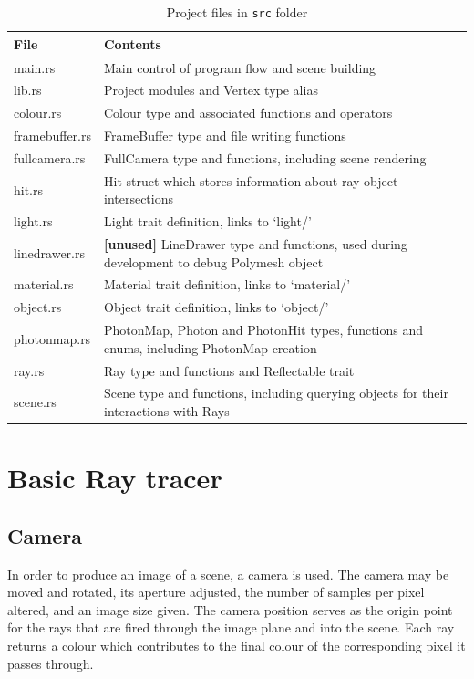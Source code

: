 \documentclass[a4paper]{article}
\begin{document}
\begin{table}[h]
    \centering
    \caption{Project files in \texttt{src} folder}
    \label{tab:projfiles}
        \begin{tabular}{@{}l|l@{}}
            \toprule
            File & Contents \\ \midrule
            main.rs & Main control of program flow and scene building \\
            lib.rs & Project modules and Vertex type alias \\
            colour.rs & Colour type and associated functions and operators \\
            framebuffer.rs & FrameBuffer type and file writing functions \\ 
            fullcamera.rs & FullCamera type and functions, including scene rendering \\
            hit.rs & Hit struct which stores information about ray-object intersections \\
            light.rs & Light trait definition, links to `light/' \\
            linedrawer.rs & \textbf{[unused]} LineDrawer type and functions, used during development to debug Polymesh object \\
            material.rs & Material trait definition, links to `material/' \\
            object.rs &  Object trait definition, links to `object/' \\
            photonmap.rs & PhotonMap, Photon and PhotonHit types, functions and enums, including PhotonMap creation \\
            ray.rs & Ray type and functions and Reflectable trait \\
            scene.rs & Scene type and functions, including querying objects for their interactions with Rays \\
            \bottomrule
        \end{tabular}
\end{table}

\section{Basic Ray tracer}
\subsection{Camera}
In order to produce an image of a scene, a camera is used. The camera may be moved and rotated, its aperture adjusted, the number of samples per pixel altered, and an image size given. The camera position serves as the origin point for the rays that are fired through the image plane and into the scene. Each ray returns a colour which contributes to the final colour of the corresponding pixel it passes through.\\
\end{document}
